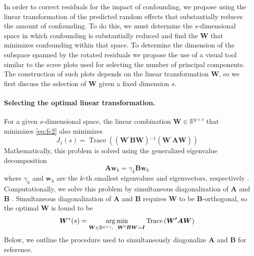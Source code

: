 \documentclass[12pt]{article} %
\newcommand{\inv}{\ensuremath{^{-1}}}
\newcommand{\trans}{\ensuremath{^\prime}}
\DeclareMathOperator{\tr}{Trace}
\DeclareMathOperator*{\argmin}{arg\, min}
\begin{document}
In order to correct residuals for the impact of confounding, we propose using the linear transformation of the predicted random effects that substantially reduces the amount of confounding. To do this, we must determine the $s$-dimensional space in which confounding is substantially reduced and find the $\bm{W}$ that minimizes confounding within that space. To determine the dimension of the subspace spanned by the rotated residuals we propose the use of a  visual tool similar to the scree plots used for selecting the number of principal components. The construction of such plots depends on the linear transformation $\bm W$, so we first discuss the selection of $\bm{W}$ given  a fixed dimension $s$.

\paragraph{Selecting the optimal linear transformation.}
For a given $s$-dimensional space, the linear combination $\bm{W} \in \mathbb{R}^{q \times s}$ that minimizes \eqref{eq:fc2} also minimizes
%
\begin{equation}\label{eq:minimize}
J_1(s) = \tr\left( \left(\bm{W\trans B W} \right)\inv \left(\bm{W\trans A W}\right) \right)
\end{equation}
%
Mathematically, this problem is solved using the generalized eigenvalue decomposition
%
\begin{equation}\label{eq:geigen}
	\bm{Aw}_k = \gamma_k \bm{Bw}_k
\end{equation}
%
where $\gamma_k$ and $\bm{w}_k$ are the $k$-th smallest eigenvalues and eigenvectors, respectively \citep{Fukunaga:1990}. 
Computationally, we solve this problem by simultaneous diagonalization of $\bm{A}$ and $\bm{B}$ \citep{McDonald:1979ca, deLeeuw:1982to}. Simultaneous diagonalization of $\bm{A}$ and $\bm{B}$ requires $\bm{W}$ to be $\bm{B}$-orthogonal, so the optimal $\bm{W}$ is found to be
%
\begin{equation}\label{eq:optimw}
	\bm{W}^*(s) = \argmin_{ 
      \bm{W} \in \mathbb{R}^{q \times s}, \ \ 
      \bm{W\trans B W} = \bm{I}
	} 
\tr\left( \bm{W\trans A W} \right) 
\end{equation}
%
Below, we outline the procedure used to simultaneously diagonalize $\bm{A}$ and $\bm{B}$ for reference.\\
\end{document}
